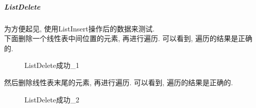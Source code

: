 \documentclass[supercite]{Experimental_Report}
\theoremstyle{definition}
\begin{document}
\subparagraph{ListDelete}
\noindent
为方便起见, 使用ListInsert操作后的数据来测试.\\
下面删除一个线性表中间位置的元素, 再进行遍历. 可以看到, 遍历的结果是正确的.
\begin{figure}[htbp]
	\centering
	\centering
	\caption{ListDelete成功\_1}
	\label{fig1-46}
\end{figure}

\clearpage
\noindent
然后删除线性表末尾的元素, 再进行遍历. 可以看到, 遍历的结果是正确的.
\begin{figure}[htbp]
	\centering
	\centering
	\caption{ListDelete成功\_2}
	\label{fig1-47}
\end{figure}
\end{document}
